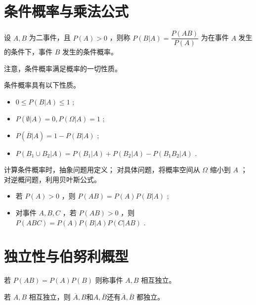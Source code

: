 \section{条件概率与乘法公式}

\begin{Def}[条件概率]

    设 $ A,B $ 为二事件，且 $ P(A) > 0 $ ，则称 $ P(B|A) = \dfrac{P(AB)}{P(A)} $ 
    为在事件 $ A $ 发生的条件下，事件 $ B $ 发生的条件概率。
\end{Def}

注意，条件概率满足概率的一切性质。

条件概率具有以下性质。
\begin{itemize}
    \item $ 0\leq P(B|A)\leq 1 $ ;
    \item $ P(\emptyset|A) = 0,P(\Omega|A) = 1 $ ;
    \item $ P(\overline B|A) = 1-P(B|A) $ ;
    \item $ P(B_1\cup B_2|A) = P(B_1|A) + P(B_2|A) - P(B_1B_2|A) $ .
\end{itemize}

计算条件概率时，抽象问题用定义；
对具体问题，将概率空间从 $ \Omega $ 缩小到 $ A $ ；
对逆概问题，利用贝叶斯公式。

\begin{Field}[条件概率的乘法公式]

    \begin{itemize}
        \item 若 $ P(A)>0 $ ，则 $ P(AB) = P(A)P(B|A) $ ;
        \item 对事件 $ A,B,C $ ，若 $ P(AB)>0 $ ，则
        $ P(ABC) = P(A)P(B|A)P(C|AB) $ .
    \end{itemize}
\end{Field}

\section{独立性与伯努利概型}


\begin{Def}[独立性]

    若 $ P(AB)=P(A)P(B) $ 则称事件 $ A,B $ 相互独立。

    若 $ A,B $ 相互独立，则 $\overline A,B $和$ A,\overline B $还有$ \overline A,\overline B $ 都独立。
\end{Def}


